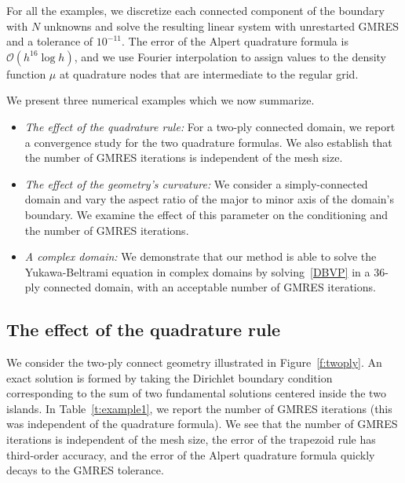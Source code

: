 For all the examples, we discretize each connected component of the
boundary with $N$ unknowns and solve the resulting linear system with
unrestarted GMRES and a tolerance of $10^{-11}$.  The error of the
Alpert quadrature formula is $\mathcal{O}(h^{16}\log h)$, and we use
Fourier interpolation to assign values to the density function $\mu$ at
quadrature nodes that are intermediate to the regular grid.

We present three numerical examples which we now summarize.
\begin{itemize}
  \item{\em{The effect of the quadrature rule}:} For a two-ply connected
  domain, we report a convergence study for the two quadrature formulas.
  We also establish that the number of GMRES iterations is independent
  of the mesh size.


  \item{\em{The effect of the geometry's curvature}:} We consider a
  simply-connected domain and vary the aspect ratio of the major to
  minor axis of the domain's boundary.  We examine the effect of this
  parameter on the conditioning and the number of GMRES iterations.

  \item{\em{A complex domain}:} We demonstrate that our method is able
  to solve the Yukawa-Beltrami equation in complex domains by
  solving~\eqref{DBVP} in a 36-ply connected domain, with an acceptable
  number of GMRES iterations.
\end{itemize}


\subsection{The effect of the quadrature rule}
We consider the two-ply connect geometry illustrated in
Figure~\ref{f:twoply}.  An exact solution is formed by taking the
Dirichlet boundary condition corresponding to the sum of two fundamental
solutions centered inside the two islands.  In Table~\ref{t:example1},
we report the number of GMRES iterations (this was independent of the
quadrature formula).  We see that the number of GMRES iterations is
independent of the mesh size, the error of the trapezoid rule has
third-order accuracy, and the error of the Alpert quadrature formula
quickly decays to the GMRES tolerance.


